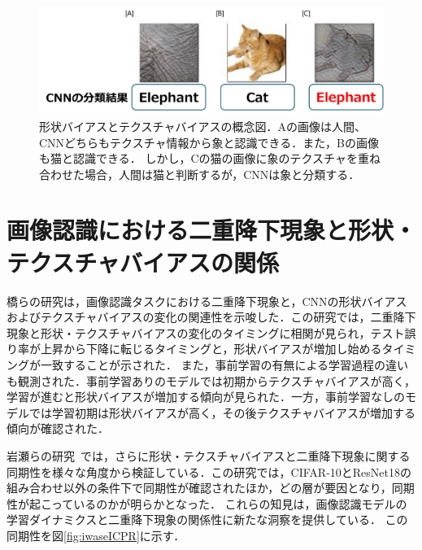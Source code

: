 
\begin{figure}[h]
    \centering
    \includegraphics[width=\linewidth]{fig/shapetexturebias.pdf}
    \caption{形状バイアスとテクスチャバイアスの概念図．Aの画像は人間、CNNどちらもテクスチャ情報から象と認識できる．また，Bの画像も猫と認識できる．
    しかし，Cの猫の画像に象のテクスチャを重ね合わせた場合，人間は猫と判断するが，CNNは象と分類する．}
\end{figure}

\newpage

\section{画像認識における二重降下現象と形状・テクスチャバイアスの関係}

橋らの研究\cite{DD_STB}は，画像認識タスクにおける二重降下現象と，CNNの形状バイアスおよびテクスチャバイアスの変化の関連性を示唆した．この研究では，二重降下現象と形状・テクスチャバイアスの変化のタイミングに相関が見られ，テスト誤り率が上昇から下降に転じるタイミングと，形状バイアスが増加し始めるタイミングが一致することが示された．
また，事前学習の有無による学習過程の違いも観測された．事前学習ありのモデルでは初期からテクスチャバイアスが高く，学習が進むと形状バイアスが増加する傾向が見られた．一方，事前学習なしのモデルでは学習初期は形状バイアスが高く，その後テクスチャバイアスが増加する傾向が確認された．

岩瀬らの研究~\cite{icpr2024iwase}では，さらに形状・テクスチャバイアスと二重降下現象に関する同期性を様々な角度から検証している．この研究では，CIFAR-10とResNet18の組み合わせ以外の条件下で同期性が確認されたほか，どの層が要因となり，同期性が起こっているのかが明らかとなった．
これらの知見は，画像認識モデルの学習ダイナミクスと二重降下現象の関係性に新たな洞察を提供している．
この同期性を図\ref{fig:iwaseICPR}に示す．

